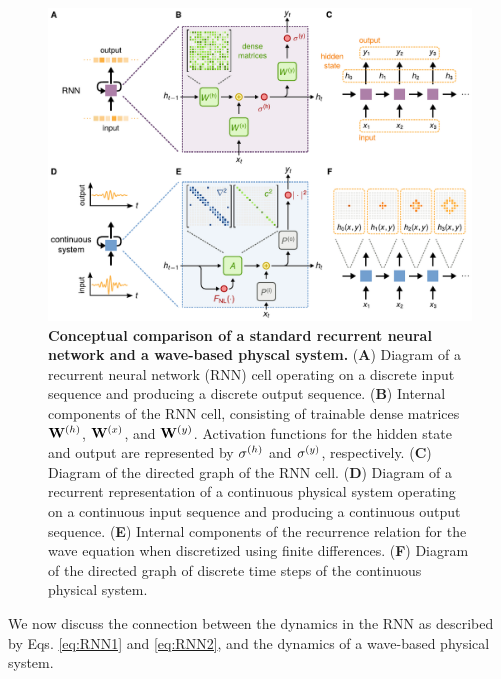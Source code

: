 \begin{figure}
  \centering
  \includegraphics[width=\textwidth]{figures/insitu_RNN}
  \caption{
  \textbf{Conceptual comparison of a standard recurrent neural network and a wave-based physcal system.}
  (\textbf{A})
  Diagram of a recurrent neural network (RNN) cell operating on a discrete input sequence and producing a discrete output sequence. 
  (\textbf{B})
  Internal components of the RNN cell, consisting of trainable dense matrices $\mathbf{W}^{(h)}$, $\mathbf{W}^{(x)}$, and $\mathbf{W}^{(y)}$. 
  Activation functions for the hidden state and output are represented by $\sigma^{(h)}$ and $\sigma^{(y)}$, respectively. 
  (\textbf{C}) 
  Diagram of the directed graph of the RNN cell. 
  (\textbf{D}) 
  Diagram of a recurrent representation of a continuous physical system operating on a continuous input sequence and producing a continuous output sequence. 
  (\textbf{E}) 
  Internal components of the recurrence relation for the wave equation when discretized using finite differences. 
  (\textbf{F}) 
  Diagram of the directed graph of discrete time steps of the continuous physical system.}
  \label{fig:RNN}
\end{figure}

We now discuss the connection between the dynamics in the RNN as described by Eqs. \ref{eq:RNN1} and \ref{eq:RNN2}, and the dynamics of a wave-based physical system.

